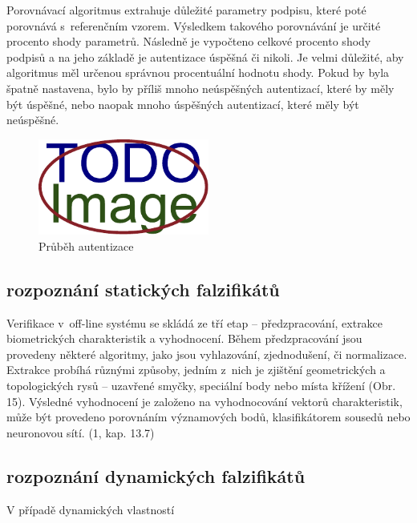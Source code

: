 Porovnávací algoritmus extrahuje důležité parametry podpisu, které poté porovnává s~referenčním vzorem. 
Výsledkem takového porovnávání je určité procento shody parametrů.
Následně je vypočteno celkové procento shody podpisů a na jeho základě je autentizace úspěšná či nikoli.
Je velmi důležité, aby algoritmus měl určenou správnou procentuální hodnotu shody.
Pokud by byla špatně nastavena, bylo by příliš mnoho neúspěšných autentizací, které by měly být úspěšné, nebo naopak mnoho úspěšných autentizací, které měly být neúspěšné.

\begin{figure}[h]
\centering
\includegraphics[width=0.5\textwidth]{obrazky-figures/placeholder.pdf}
\caption{Průběh autentizace}
\label{fig:my-pdf}
\end{figure}

\subsection{rozpoznání statických falzifikátů} %


Verifikace v~off-line systému se skládá ze tří etap – předzpracování, extrakce biometrických
charakteristik a vyhodnocení. Během předzpracování jsou provedeny některé algoritmy, jako
jsou vyhlazování, zjednodušení, či normalizace. Extrakce probíhá různými způsoby, jedním
z~nich je zjištění geometrických a topologických rysů – uzavřené smyčky, speciální body
nebo místa křížení (Obr. 15). Výsledné vyhodnocení je založeno na vyhodnocování vektorů
charakteristik, může být provedeno porovnáním významových bodů, klasifikátorem sousedů
nebo neuronovou sítí. (1, kap. 13.7) %

\subsection{rozpoznání dynamických falzifikátů} %
V případě dynamických vlastností

